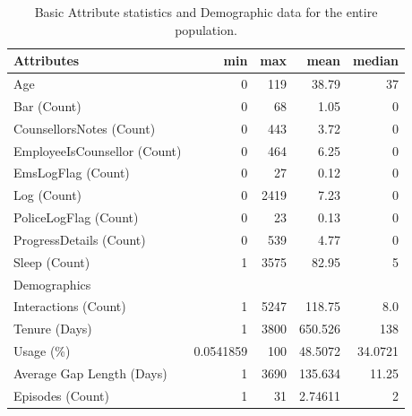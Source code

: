 \begin{table}[h]
	\centering

	\begin{tabular}{lrrrr}
	\toprule
	Attributes													 &        min &   max &     mean &   median \\
	\midrule
	Age                          &          0 &   119 &    38.79 &       37 \\
	Bar (Count)                  &          0 &    68 &     1.05 &        0 \\
	CounsellorsNotes (Count)     &          0 &   443 &     3.72 &        0 \\
	EmployeeIsCounsellor (Count) &          0 &   464 &     6.25 &        0 \\
	EmsLogFlag (Count)           &          0 &    27 &     0.12 &        0 \\
	Log (Count)                  &          0 &  2419 &     7.23 &        0 \\
	PoliceLogFlag (Count)        &          0 &    23 &     0.13 &        0 \\
	ProgressDetails (Count)      &          0 &   539 &     4.77 &        0 \\
	Sleep (Count)                &          1 &  3575 &    82.95 &        5 \\
	\midrule
	Demographics								 &         &    &      &    \\
	\midrule
	Interactions (Count)         &          1 &  5247 &   118.75 &      8.0 \\
	Tenure (Days)                &          1 &  3800 &  650.526 &      138 \\
	Usage (\%)                    &  0.0541859 &   100 &  48.5072 &  34.0721 \\
	Average Gap Length (Days)    &          1 &  3690 &  135.634 &    11.25 \\
	Episodes (Count)             &          1 &    31 &  2.74611 &        2 \\
	\bottomrule
	\end{tabular}

	\caption{Basic Attribute statistics and Demographic data for the entire population.}
	\label{tbl:stats:notchronic}
\end{table}

